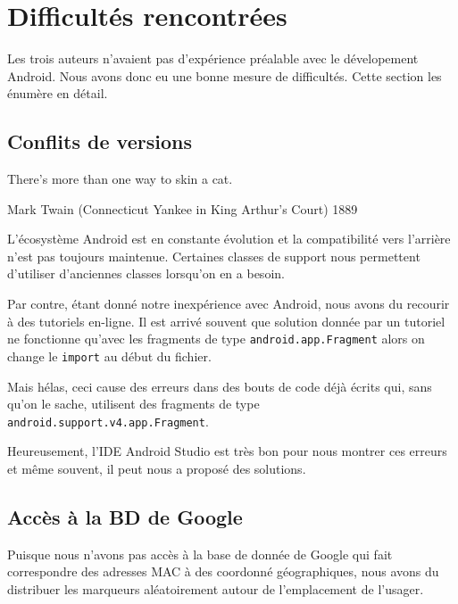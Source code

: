 \documentclass[12pt]{article}
\newcommand\code[1]{\texttt{#1}}
\begin{document}


\section{Difficultés rencontrées}

	Les trois auteurs n'avaient pas d'expérience préalable avec le dévelopement
	Android.  Nous avons donc eu une bonne mesure de difficultés.  Cette section
	les énumère en détail.

\subsection{Conflits de versions}

	{\center \og There's more than one way to skin a cat.\fg \\}
		\begin{flushright}
			{\flushright Mark Twain (Connecticut Yankee in King Arthur’s Court)
			1889}
		\end{flushright}

	L'écosystème Android est en constante évolution et la compatibilité vers
	l'arrière n'est pas toujours maintenue.  Certaines classes de support nous
	permettent d'utiliser d'anciennes classes lorsqu'on en a besoin.

	Par contre, étant donné notre inexpérience avec Android, nous avons du
	recourir à des tutoriels en-ligne.  Il est arrivé souvent que solution
	donnée par un tutoriel ne fonctionne qu'avec les fragments de type
	\code{android.app.Fragment} alors on change le \code{import} au début du
	fichier.

	Mais hélas, ceci cause des erreurs dans des bouts de code déjà écrits qui,
	sans qu'on le sache, utilisent des fragments de type
	\code{android.support.v4.app.Fragment}.

	Heureusement, l'IDE Android Studio est très bon pour nous montrer ces
	erreurs et même souvent, il peut nous a proposé des solutions.

\subsection{Accès à la BD de Google}

	Puisque nous n'avons pas accès à la base de donnée de Google qui fait
	correspondre des adresses MAC à des coordonné géographiques, nous avons du
	distribuer les marqueurs aléatoirement autour de l'emplacement de
	l'usager.
\end{document}
